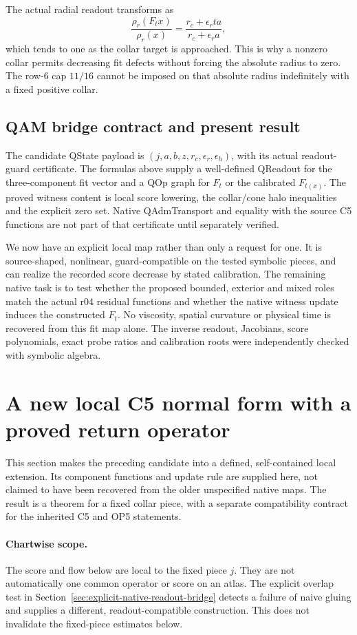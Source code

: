 \documentclass[11pt,a4paper]{article}
\begin{document}
The actual radial readout transforms as
\[
\frac{\rho_r(F_t x)}{\rho_r(x)}
=\frac{r_c+\epsilon_r ta}{r_c+\epsilon_r a},
\]
which tends to one as the collar target is approached. This is why a
nonzero collar permits decreasing fit defects without forcing the absolute
radius to zero. The row-6 cap $11/16$ cannot be imposed on that absolute
radius indefinitely with a fixed positive collar.

\subsection{QAM bridge contract and present result}
The candidate QState payload is $(j,a,b,z,r_c,\epsilon_r,\epsilon_h)$,
with its actual readout-guard certificate. The formulas above supply a
well-defined QReadout for the three-component fit vector and a QOp graph
for $F_t$ or the calibrated $F_{t(x)}$. The proved witness content is
local score lowering, the collar/cone halo inequalities and the explicit
zero set. Native QAdmTransport and equality with the source C5 functions
are not part of that certificate until separately verified.

We now have an explicit local map rather than only a request for one.
It is source-shaped, nonlinear, guard-compatible on the tested symbolic
pieces, and can realize the recorded score decrease by stated calibration.
The remaining native task is to test whether the proposed bounded, exterior
and mixed roles match the actual r04 residual functions and whether the
native witness update induces the constructed $F_t$. No viscosity, spatial
curvature or physical time is recovered from this fit map alone.
The inverse readout, Jacobians, score polynomials, exact probe ratios and
calibration roots were independently checked with symbolic algebra.

\section{A new local C5 normal form with a proved return operator}
\label{sec:new-local-c5-normal-form}
This section makes the preceding candidate into a defined, self-contained
local extension. Its component functions and update rule are supplied here,
not claimed to have been recovered from the older unspecified native maps.
The result is a theorem for a fixed collar piece, with a separate compatibility
contract for the inherited C5 and OP5 statements.

\paragraph{Chartwise scope.}
The score and flow below are local to the fixed piece $j$. They are not
automatically one common operator or score on an atlas. The explicit
overlap test in Section~\ref{sec:explicit-native-readout-bridge} detects
a failure of naive gluing and supplies a different, readout-compatible
construction. This does not invalidate the fixed-piece estimates below.
\end{document}
